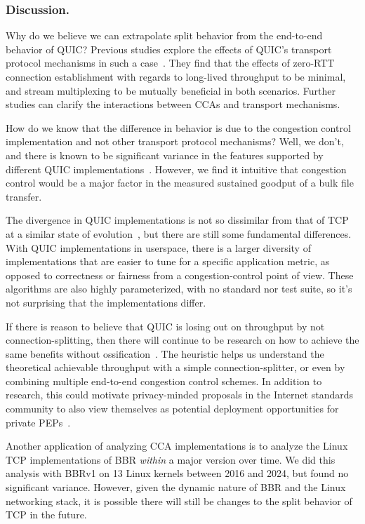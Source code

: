 \subsubsection{Discussion.}

Why do we believe we can extrapolate split behavior from the end-to-end behavior
of QUIC? Previous studies explore the effects of QUIC's transport protocol
mechanisms in such a case~\cite{kosek2022quicpep,thomas2019google}. They find
that the effects of zero-RTT connection establishment with regards to
long-lived throughput to be minimal, and stream multiplexing to be mutually
beneficial in both scenarios. Further studies can clarify the interactions
between CCAs and transport mechanisms.

How do we know that the difference in behavior is due to the congestion control
implementation and not other transport protocol mechanisms? Well, we
don't, and there is known to be significant variance in the features supported
by different QUIC implementations~\cite{marx2020same}.
However, we find it intuitive that congestion control would be a major factor in
the measured sustained goodput of a bulk file transfer.

The divergence in QUIC implementations is not so dissimilar from that of TCP at
a similar state of evolution~\cite{allman1999effective}, but there are still
some fundamental differences. With QUIC implementations in userspace, there is
a larger diversity of implementations that are easier to tune for a specific
application metric, as opposed to correctness or fairness from a
congestion-control point of view. These algorithms are also highly
parameterized, with no standard nor test suite, so it's not surprising that the
implementations differ.

If there is reason to believe
that QUIC is losing out on throughput by not connection-splitting, then there
will continue to be research on how to achieve the same benefits without
ossification~\cite{kosek2023secure,yuan2024sidekick,kramer2021masquepep,yuan2022sidecar}.
The heuristic helps us understand the theoretical achievable
throughput with a simple connection-splitter, or even by combining multiple
end-to-end congestion control schemes.
In addition to research, this could motivate privacy-minded proposals in the Internet
standards community to also view themselves as potential deployment opportunities
for private PEPs~\cite{kosek2021masque,sattler2022towards,rfc9297,rfc9298}.

Another application of analyzing CCA implementations is to analyze the Linux TCP
implementations of BBR \textit{within} a major version over time. We did
this analysis with BBRv1 on 13 Linux kernels between 2016 and 2024, but found
no significant variance. However, given the dynamic nature of BBR and the
Linux networking stack, it
is possible there will still be changes to the split behavior of TCP in the future.

